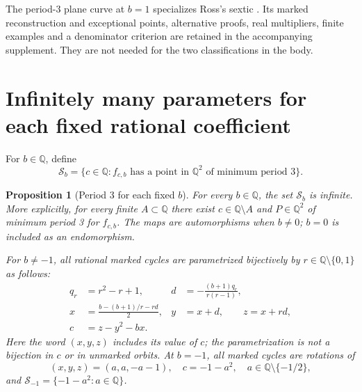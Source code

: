 \documentclass{jT}
\newcommand{\Q}{\mathbb Q}
\newtheorem{proposition}{Proposition}[section]
\begin{document}
The period-3 plane curve at $b=1$ specializes Ross's sextic \cite[\S3.1, p.~54]{ross}. Its marked reconstruction and exceptional points, alternative proofs, real multipliers, finite examples and a denominator criterion are retained in the accompanying supplement. They are not needed for the two classifications in the body.


\section{Infinitely many parameters for each fixed rational coefficient}\label{sec:all-b}
For $b\in\Q$, define
\[
\mathcal S_b=\{c\in\Q:\text{$f_{c,b}$ has a point in $\Q^2$ of minimum period 3}\}.
\]
\begin{proposition}[Period 3 for each fixed $b$]\label{prop:all-b}
For every $b\in\Q$, the set $\mathcal S_b$ is infinite. More explicitly, for every finite $A\subset\Q$ there exist $c\in\Q\setminus A$ and $P\in\Q^2$ of minimum period 3 for $f_{c,b}$. The maps are automorphisms when $b\ne0$; $b=0$ is included as an endomorphism.

For $b\ne-1$, all rational marked cycles are parametrized bijectively by $r\in\Q\setminus\{0,1\}$ as follows:
\begin{equation}\label{eq:all-b}
\begin{aligned}
q_r&=r^2-r+1,& d&=-\frac{(b+1)q_r}{r(r-1)},\\
x&=\frac{b-(b+1)/r-rd}{2},& y&=x+d,\qquad z=x+rd,\\
c&=z-y^2-bx.
\end{aligned}
\end{equation}
Here the word $(x,y,z)$ includes its value of $c$; the parametrization is not a bijection in $c$ or in unmarked orbits. At $b=-1$, all marked cycles are rotations of
\begin{equation}\label{eq:minus-one}
(x,y,z)=(a,a,-a-1),\quad c=-1-a^2,\quad a\in\Q\setminus\{-1/2\},
\end{equation}
and $\mathcal S_{-1}=\{-1-a^2:a\in\Q\}$.
\end{proposition}
\end{document}
